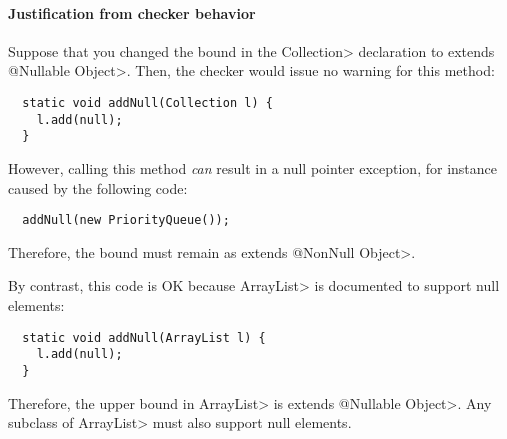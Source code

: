 \paragraph{Justification from checker behavior\label{faq-list-map-nonnull-typeargs-justification-from-behavior}}

Suppose that you changed the bound in the \<Collection> declaration to
\<extends @Nullable Object>.  Then, the checker would issue no warning for
this method:

\begin{Verbatim}
  static void addNull(Collection l) {
    l.add(null);
  }
\end{Verbatim}

\noindent
However, calling this method \emph{can} result in a null pointer exception,
for instance caused by the following code:

\begin{Verbatim}
  addNull(new PriorityQueue());
\end{Verbatim}

\noindent
Therefore, the bound must remain as \<extends @NonNull Object>.

By contrast, this code is OK because \<ArrayList> is documented to support
null elements:

\begin{Verbatim}
  static void addNull(ArrayList l) {
    l.add(null);
  }
\end{Verbatim}

\noindent
Therefore, the upper bound in \<ArrayList> is \<extends @Nullable Object>.
Any subclass of \<ArrayList> must also support null elements.










